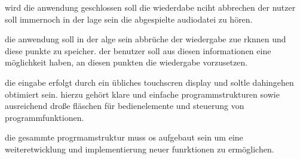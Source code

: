 wird die anwendung geschlossen soll die wiederdabe nciht abbrechen der nutzer soll immernoch in der lage sein die abgespielte audiodatei zu hören.

die anwendung soll in der alge sein abbrüche der wiedergabe zue rknnen und diese punkte zu speicher. der benutzer soll aus diesen informationen eine möglichkeit haben, an diesen punkten die wiedergabe vorzusetzen.

die eingabe erfolgt durch ein übliches touchscren display und soltle dahingehen obtimiert sein. hierzu gehört klare und einfache programmstrukturen sowie ausreichend droße fläschen für bedienelemente und steuerung von programmfunktionen.

die gesammte progrmamstruktur muss os aufgebaut sein um eine weiteretwicklung und implementierung neuer funrktionen zu ermöglichen.
